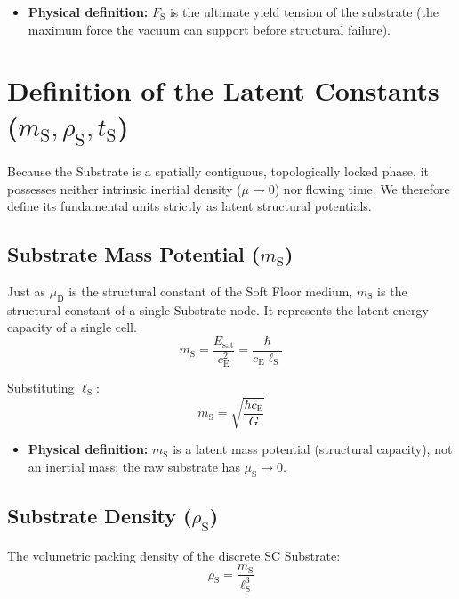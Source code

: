 \begin{itemize}
    \item \textbf{Physical definition:} $F_{\mathrm{S}}$ is the ultimate yield tension of the substrate (the maximum force the vacuum can support before structural failure).
\end{itemize}

\section{Definition of the Latent Constants (\texorpdfstring{$m_{\mathrm{S}}, \rho_{\mathrm{S}}, t_{\mathrm{S}}$}{m\_S, rho\_S, t\_S})}
Because the Substrate is a spatially contiguous, topologically locked phase, it possesses neither intrinsic inertial density ($\mu \to 0$) nor flowing time. We therefore define its fundamental units strictly as latent structural potentials.

\subsection{Substrate Mass Potential (\texorpdfstring{$m_{\mathrm{S}}$}{m\_S})}
Just as $\mu_{\mathrm{D}}$ is the structural constant of the Soft Floor medium, $m_{\mathrm{S}}$ is the structural constant of a single Substrate node. It represents the latent energy capacity of a single cell.
\begin{equation}
    m_{\mathrm{S}} = \frac{E_{\mathrm{sat}}}{c_{\mathrm{E}}^2} = \frac{\hbar}{c_{\mathrm{E}} \ell_{\mathrm{S}}}
\end{equation}

Substituting $\ell_{\mathrm{S}}$:
\begin{equation}
    m_{\mathrm{S}} = \sqrt{\frac{\hbar c_{\mathrm{E}}}{G}}
\end{equation}

\begin{itemize}
    \item \textbf{Physical definition:} $m_{\mathrm{S}}$ is a latent mass potential (structural capacity), not an inertial mass; the raw substrate has $\mu_{\mathrm{S}} \to 0$.
\end{itemize}

\subsection{Substrate Density (\texorpdfstring{$\rho_{\mathrm{S}}$}{rho\_S})}
The volumetric packing density of the discrete SC Substrate:
\begin{equation}
    \rho_{\mathrm{S}} = \frac{m_{\mathrm{S}}}{\ell_{\mathrm{S}}^3}
\end{equation}

